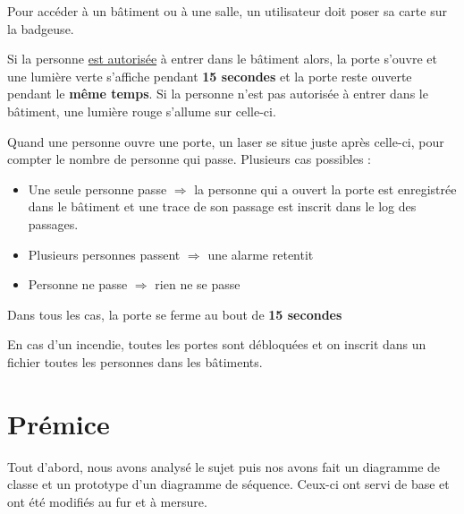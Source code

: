 \documentclass[a4paper,10pt]{article}
\begin{document}
        Pour accéder à un bâtiment ou à une salle, un utilisateur doit poser sa carte sur la badgeuse.
        \newline
        \par Si la personne \underline{est autorisée} à entrer dans le bâtiment alors, la porte s'ouvre et une lumière verte s'affiche pendant \textbf{15 secondes} et la porte reste ouverte pendant le \textbf{même temps}.
        \newline
        Si la personne n'est pas autorisée à entrer dans le bâtiment, une lumière rouge s'allume sur celle-ci.
        \newline
        \par
        Quand une personne ouvre une porte, un laser se situe juste après celle-ci, pour compter le nombre de personne qui passe. Plusieurs cas possibles :
        \begin{itemize}
            \item Une seule personne passe $\Rightarrow$ la personne qui a ouvert la porte est enregistrée dans le bâtiment et une trace de son passage est inscrit dans le log des passages.
            \item Plusieurs personnes passent $\Rightarrow$ une alarme retentit
            \item Personne ne passe $\Rightarrow$ rien ne se passe
        \end{itemize}

        Dans tous les cas, la porte se ferme au bout de \textbf{15 secondes}
        \newline

        \par En cas d'un incendie, toutes les portes sont débloquées et on inscrit dans un fichier toutes les personnes dans les bâtiments.
        \pagebreak

    \section{Prémice}
    Tout d'abord, nous avons analysé le sujet puis nos avons fait un diagramme de classe et un prototype d'un diagramme de séquence. Ceux-ci ont servi de base et ont été modifiés au fur et à mersure.
\end{document}
